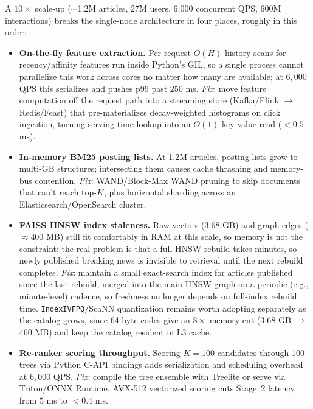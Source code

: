 \documentclass[11pt,a4paper]{article}
\begin{document}
A $10\times$ scale-up ($\sim$1.2M articles, 27M users, 6,000 concurrent QPS, 600M interactions) breaks the single-node architecture in four places, roughly in this order:
\begin{itemize}
  \item \textbf{On-the-fly feature extraction.} Per-request $O(H)$ history scans for recency/affinity features run inside Python's GIL, so a single process cannot parallelize this work across cores no matter how many are available; at $6{,}000$ QPS this serializes and pushes p99 past $250$ ms. \textit{Fix}: move feature computation off the request path into a streaming store (Kafka/Flink $\to$ Redis/Feast) that pre-materializes decay-weighted histograms on click ingestion, turning serving-time lookup into an $O(1)$ key-value read ($<0.5$ ms).

  \item \textbf{In-memory BM25 posting lists.} At 1.2M articles, posting lists grow to multi-GB structures; intersecting them causes cache thrashing and memory-bus contention. \textit{Fix}: WAND/Block-Max WAND pruning to skip documents that can't reach top-$K$, plus horizontal sharding across an Elasticsearch/OpenSearch cluster.

  \item \textbf{FAISS HNSW index staleness.} Raw vectors ($3.68$ GB) and graph edges ($\approx400$ MB) still fit comfortably in RAM at this scale, so memory is not the constraint; the real problem is that a full HNSW rebuild takes minutes, so newly published breaking news is invisible to retrieval until the next rebuild completes. \textit{Fix}: maintain a small exact-search index for articles published since the last rebuild, merged into the main HNSW graph on a periodic (e.g., minute-level) cadence, so freshness no longer depends on full-index rebuild time. \texttt{IndexIVFPQ}/ScaNN quantization remains worth adopting separately as the catalog grows, since 64-byte codes give an $8\times$ memory cut ($3.68$ GB $\to$ 460 MB) and keep the catalog resident in L3 cache.

  \item \textbf{Re-ranker scoring throughput.} Scoring $K{=}100$ candidates through 100 trees via Python C-API bindings adds serialization and scheduling overhead at $6{,}000$ QPS. \textit{Fix}: compile the tree ensemble with Treelite or serve via Triton/ONNX Runtime, AVX-512 vectorized scoring cuts Stage~2 latency from $5$ ms to $<0.4$ ms.
\end{itemize}
\end{document}
